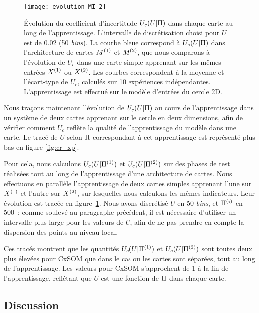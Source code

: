 \documentclass[../main]{subfiles}
\begin{document}
\begin{figure}
    \centering\texttt{[image: evolution\_MI\_2]}
    \caption{\'Evolution du coefficient d'incertitude $U_c(U|\Pi)$ dans chaque carte au long de l'apprentissage. L'intervalle de discrétisation choisi pour $U$ est de $0.02$ (50 \emph{bins}).
    La courbe bleue correspond à $U_c(U|\Pi)$ dans l'architecture de cartes $M^{({1})}$ et $M^{({2})}$, que nous comparons à l'évolution de $U_c$ dans une carte simple apprenant sur les mêmes entrées $X^{({1})}$ ou $X^{({2})}$. Les courbes correspondent à la moyenne et l'écart-type de $U_c$, calculés sur 10 expériences indépendantes. L'apprentissage est effectué sur le modèle d'entrées du cercle 2D.} 
    \label{fig:MI_evol}
    \end{figure}

Nous traçons maintenant l'évolution de $U_c(U|\Pi)$ au cours de l'apprentissage dans un système de deux cartes apprenant sur le cercle en deux dimensions, afin de vérifier comment $U_c$ reflète la qualité de l'apprentissage du modèle dans une carte. 
Le tracé de $U$ selon $\Pi$ correspondant à cet apprentissage est représenté plus bas en figure \ref{fig:cr_xp}.

Pour cela, nous calculons $U_c(U|\Pi^{({1})})$ et $U_c(U|\Pi^{({2})})$ sur des phases de test réalisées tout au long de l'apprentissage d'une architecture de cartes. Nous effectuons en parallèle l'apprentissage de deux cartes simples apprenant l'une sur $X^{({1})}$ et l'autre sur $X^{({2})}$, sur lesquelles nous calculons les mêmes indicateurs.
Leur évolution est tracée en figure~\ref{fig:MI_evol}.
Nous avons discrétisé $U$ en 50 \emph{bins}, et  $\Pi^{({i})}$ en 500~: comme soulevé au paragraphe précédent, il est nécessaire d'utiliser un intervalle plus large pour les valeurs de $U$, afin de ne pas prendre en compte la dispersion des points au niveau local.

Ces tracés montrent que les quantités $U_c(U|\Pi^{({1})})$ et $U_c(U|\Pi^{({2})})$ sont toutes deux plus élevées pour CxSOM que dans le cas ou les cartes sont séparées, tout au long de l'apprentissage. Les valeurs pour CxSOM s'approchent de 1 à la fin de l'apprentissage, reflétant que $U$ est une fonction de $\Pi$ dans chaque carte.

\subsection{Discussion}
\end{document}
